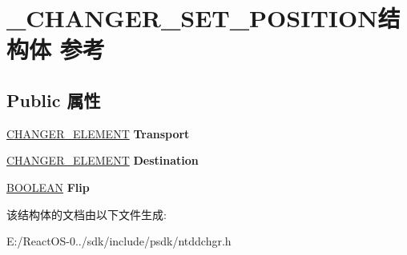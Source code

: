 \hypertarget{struct___c_h_a_n_g_e_r___s_e_t___p_o_s_i_t_i_o_n}{}\section{\+\_\+\+C\+H\+A\+N\+G\+E\+R\+\_\+\+S\+E\+T\+\_\+\+P\+O\+S\+I\+T\+I\+O\+N结构体 参考}
\label{struct___c_h_a_n_g_e_r___s_e_t___p_o_s_i_t_i_o_n}
\subsection*{Public 属性}
\begin{DoxyCompactItemize}
\item 
\mbox{\label{struct___c_h_a_n_g_e_r___s_e_t___p_o_s_i_t_i_o_n_a58012017e8c7f1d407cdd10368882858}} 
\hyperlink{struct___c_h_a_n_g_e_r___e_l_e_m_e_n_t}{C\+H\+A\+N\+G\+E\+R\+\_\+\+E\+L\+E\+M\+E\+NT} {\bfseries Transport}
\item 
\mbox{\label{struct___c_h_a_n_g_e_r___s_e_t___p_o_s_i_t_i_o_n_a416fcbd29452b733da4df206524a95d3}} 
\hyperlink{struct___c_h_a_n_g_e_r___e_l_e_m_e_n_t}{C\+H\+A\+N\+G\+E\+R\+\_\+\+E\+L\+E\+M\+E\+NT} {\bfseries Destination}
\item 
\mbox{\label{struct___c_h_a_n_g_e_r___s_e_t___p_o_s_i_t_i_o_n_a3924c2947a23cd980ade905eb056c1da}} 
\hyperlink{_processor_bind_8h_a112e3146cb38b6ee95e64d85842e380a}{B\+O\+O\+L\+E\+AN} {\bfseries Flip}
\end{DoxyCompactItemize}


该结构体的文档由以下文件生成\+:\begin{DoxyCompactItemize}
\item 
E\+:/\+React\+O\+S-\/0../sdk/include/psdk/ntddchgr.\+h\end{DoxyCompactItemize}
